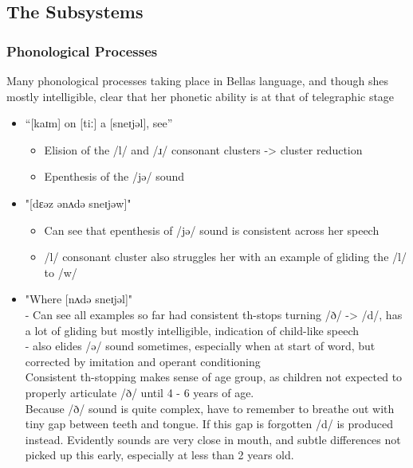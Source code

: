 \documentclass[
]{article}
\providecommand{\tightlist}{%
  \setlength{\itemsep}{0pt}\setlength{\parskip}{0pt}}
\begin{document}
\hypertarget{the-subsystems}{%
\subsection{The Subsystems}\label{the-subsystems}}

\hypertarget{phonological-processes}{%
\subsubsection{Phonological Processes}\label{phonological-processes}}

Many phonological processes taking place in Bella\textquotesingle s
language, and though she\textquotesingle s mostly intelligible, clear
that her phonetic ability is at that of telegraphic stage

\begin{itemize}
\tightlist
\item
  ``{[}kaɪm{]} on {[}tiː{]} a {[}sneɪjəl{]}, see''

  \begin{itemize}
  \tightlist
  \item
    Elision of the /l/ and /ɹ/ consonant clusters -\textgreater{}
    cluster reduction
  \item
    Epenthesis of the /jə/ sound
  \end{itemize}
\item
  "{[}dɛəz ənʌdə sneɪjəw{]}"

  \begin{itemize}
  \tightlist
  \item
    Can see that epenthesis of /jə/ sound is consistent across her
    speech
  \item
    /l/ consonant cluster also struggles her with an example of gliding
    the /l/ to /w/
  \end{itemize}
\item
  "Where {[}nʌdə sneɪjəl{]}"\\
  - Can see all examples so far had consistent th-stops turning /ð/
  -\textgreater{} /d/, has a lot of gliding but mostly intelligible,
  indication of child-like speech\\
  - also elides /ə/ sound sometimes, especially when at start of word,
  but corrected by imitation and operant conditioning\\
  Consistent th-stopping makes sense of age group, as children not
  expected to properly articulate /ð/ until 4 - 6 years of age.\\
  Because /ð/ sound is quite complex, have to remember to breathe out
  with tiny gap between teeth and tongue. If this gap is forgotten /d/
  is produced instead. Evidently sounds are very close in mouth, and
  subtle differences not picked up this early, especially at less than 2
  years old.
\end{itemize}
\end{document}
